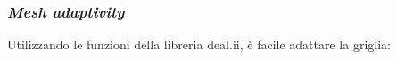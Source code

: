 \documentclass{beamer}
\begin{document}

\begin{frame}[c]
 \frametitle{\emph{Mesh adaptivity}}
 Utilizzando le funzioni della libreria \textsf{deal.ii}, è facile adattare la griglia:
 \begin{figure}
 \begin{subfigure}{0.48\linewidth}
 \centering
 \end{subfigure}
 \hfill
 \begin{subfigure}{0.48\linewidth}
  \centering
\end{subfigure}
\end{figure}
\end{frame}
\end{document}
